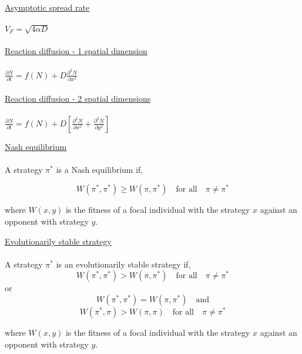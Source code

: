 \documentclass[11pt, oneside, twocolumn]{article} 	%
\begin{document}
\underline{Asymptotic spread rate}
\\
\\
$V_F = \sqrt{4 \alpha D}$
\\
\\

\underline{Reaction diffusion - 1 spatial dimension}
\\
\\
$\frac{\partial N}{\partial t} = f(N) + D \frac{\partial^2N}{\partial x^2}$
\\
\\

\underline{Reaction diffusion - 2 spatial dimensions}
\\
\\
$\frac{\partial N}{\partial t} = f(N) + D\left[ \frac{\partial^2N}{\partial x^2}+ \frac{\partial^2N}{\partial y^2} \right]$

\underline{Nash equilibrium}
\\
\\
A strategy $\pi^*$ is a Nash equilibrium if,

\[W(\pi^*, \pi^*) \geq W(\pi, \pi^*) \quad \mbox{for all} \quad {\pi \neq \pi^*} \]

where $W(x,y)$ is the fitness of a focal individual with the strategy $x$ against an opponent with strategy $y$.

\underline{Evolutionarily stable strategy}
\\
\\
A strategy $\pi^*$ is an evolutionarily stable strategy if,
%
\[W(\pi^*, \pi^*) > W(\pi, \pi^*) \quad \mbox{for all} \quad {\pi \neq \pi^*} \]
%
or
%
\[W(\pi^*,\pi^*) = W(\pi, \pi^*) \quad \mbox{and}\]
\[W(\pi^*, \pi) > W(\pi,\pi) \quad \mbox{for all} \quad \pi \neq \pi^* \]

where $W(x,y)$ is the fitness of a focal individual with the strategy $x$ against an opponent with strategy $y$.
\end{document}
